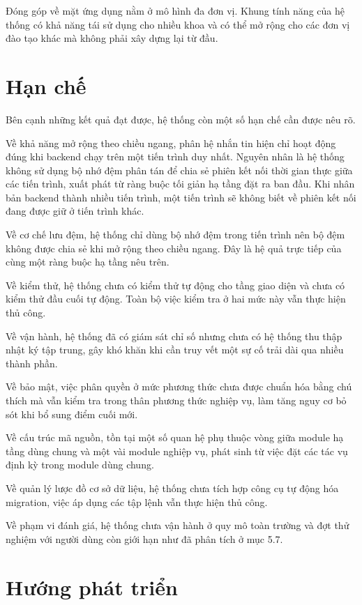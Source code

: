\documentclass[12pt,a4paper,oneside]{report}
\begin{document}
Đóng góp về mặt ứng dụng nằm ở mô hình đa đơn vị. Khung tính năng của hệ thống có khả năng tái sử dụng cho nhiều khoa và có thể mở rộng cho các đơn vị đào tạo khác mà không phải xây dựng lại từ đầu.

\section{Hạn chế}

Bên cạnh những kết quả đạt được, hệ thống còn một số hạn chế cần được nêu rõ.

Về khả năng mở rộng theo chiều ngang, phân hệ nhắn tin hiện chỉ hoạt động đúng khi backend chạy trên một tiến trình duy nhất. Nguyên nhân là hệ thống không sử dụng bộ nhớ đệm phân tán để chia sẻ phiên kết nối thời gian thực giữa các tiến trình, xuất phát từ ràng buộc tối giản hạ tầng đặt ra ban đầu. Khi nhân bản backend thành nhiều tiến trình, một tiến trình sẽ không biết về phiên kết nối đang được giữ ở tiến trình khác.

Về cơ chế lưu đệm, hệ thống chỉ dùng bộ nhớ đệm trong tiến trình nên bộ đệm không được chia sẻ khi mở rộng theo chiều ngang. Đây là hệ quả trực tiếp của cùng một ràng buộc hạ tầng nêu trên.

Về kiểm thử, hệ thống chưa có kiểm thử tự động cho tầng giao diện và chưa có kiểm thử đầu cuối tự động. Toàn bộ việc kiểm tra ở hai mức này vẫn thực hiện thủ công.

Về vận hành, hệ thống đã có giám sát chỉ số nhưng chưa có hệ thống thu thập nhật ký tập trung, gây khó khăn khi cần truy vết một sự cố trải dài qua nhiều thành phần.

Về bảo mật, việc phân quyền ở mức phương thức chưa được chuẩn hóa bằng chú thích mà vẫn kiểm tra trong thân phương thức nghiệp vụ, làm tăng nguy cơ bỏ sót khi bổ sung điểm cuối mới.

Về cấu trúc mã nguồn, tồn tại một số quan hệ phụ thuộc vòng giữa module hạ tầng dùng chung và một vài module nghiệp vụ, phát sinh từ việc đặt các tác vụ định kỳ trong module dùng chung.

Về quản lý lược đồ cơ sở dữ liệu, hệ thống chưa tích hợp công cụ tự động hóa migration, việc áp dụng các tập lệnh vẫn thực hiện thủ công.

Về phạm vi đánh giá, hệ thống chưa vận hành ở quy mô toàn trường và đợt thử nghiệm với người dùng còn giới hạn như đã phân tích ở mục 5.7.

\section{Hướng phát triển}
\end{document}
